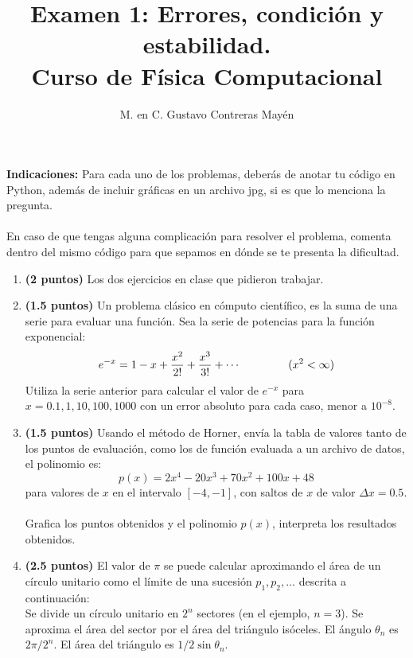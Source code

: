 \documentclass[11pt]{article}
\title{Examen 1: Errores, condición y estabilidad. \\ Curso de Física Computacional}
\author{M. en C. Gustavo Contreras Mayén}
\date{ }
\begin{document}
\maketitle
\fontsize{14}{14}\selectfont
\textbf{Indicaciones: } Para cada uno de los problemas, deber\'{a}s de anotar tu c\'{o}digo en Python, adem\'{a}s de incluir gr\'{a}ficas en un archivo jpg, si es que lo menciona la pregunta.
\\
\\
En caso de que tengas alguna complicaci\'{o}n para resolver el problema, comenta dentro del mismo c\'{o}digo para que sepamos en d\'{o}nde se te presenta la dificultad.
\begin{enumerate}
\item \textbf{(2 puntos) } Los dos ejercicios en clase que pidieron trabajar.  
\item \textbf{(1.5 puntos) }Un problema cl\'{a}sico en c\'{o}mputo cient\'{i}fico, es la suma de una serie para evaluar una funci\'{o}n. Sea la serie de potencias para la funci\'{o}n exponencial:
\[e^{-x} = 1 - x + \dfrac{x^{2}}{2!} + \dfrac{x^{3}}{3!} +\cdots \hspace{1.5cm} (x^{2} < \infty)  \]
Utiliza la serie anterior para calcular el valor de $e^{-x}$ para $x=0.1,1,10, 100, 1000$ con un error absoluto para cada caso, menor a $10^{-8}$.
\item \textbf{(1.5 puntos) }Usando el m\'{e}todo de Horner, env\'{i}a la tabla de valores tanto de los puntos de evaluaci\'{o}n, como los de funci\'{o}n evaluada a un archivo de datos, el polinomio es:
\[p(x)= 2x^{4} - 20x^{3} + 70x^{2}+ 100x+48 \]
para valores de $x$ en el intervalo $[-4,-1]$, con saltos de $x$ de valor $\Delta x = 0.5$.
\\
\\
Grafica los puntos obtenidos y el polinomio $p(x)$, interpreta los resultados obtenidos.
\item \textbf{(2.5 puntos) } El valor de $\pi$ se puede calcular aproximando el \'{a}rea de un c\'{i}rculo unitario como el l\'{i}mite de una sucesi\'{o}n $p_{1}, p_{2}, \ldots$ descrita a continuaci\'{o}n:
\\
Se divide un c\'{i}rculo unitario en $2^{n}$ sectores (en el ejemplo, $n=3$). Se aproxima el \'{a}rea del sector por el \'{a}rea del tri\'{a}ngulo is\'{o}celes. El \'{a}ngulo $\theta_{n}$ es $2 \pi / 2^{n}$. El \'{a}rea del tri\'{a}ngulo es $1/2 \sin \theta_{n}$.
\\
\begin{figure}[H]
\centering
\begin{tikzpicture}

\end{tikzpicture}
\end{figure}
\end{enumerate}
\end{document}
